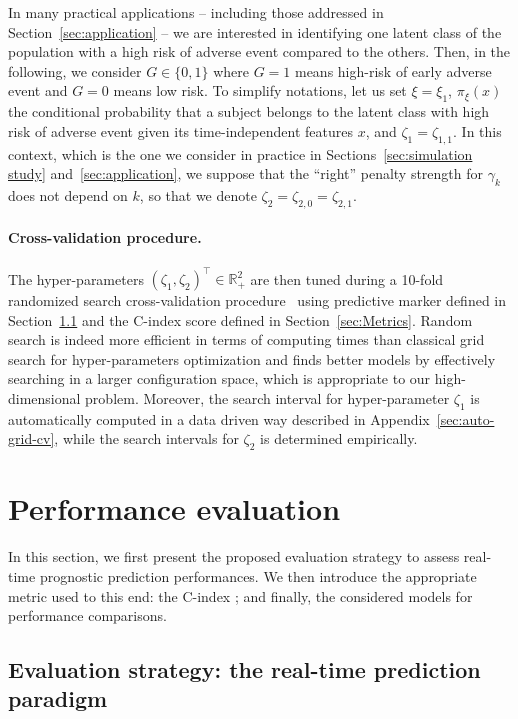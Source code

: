 \documentclass[11pt]{article}
\newcommand{\R}{\mathds R}
\begin{document}
In many practical applications -- including those addressed in Section~\ref{sec:application} -- we are interested in identifying one latent class of the population with a high risk of adverse event compared to the others. Then, in the following, we consider $G \in \{ 0, 1\}$ where $G=1$ means high-risk of early adverse event and $G=0$ means low risk.
To simplify notations, let us set $\xi = \xi_1$, $\pi_\xi(x)$ the conditional probability that a subject belongs to the latent class with high risk of adverse event given its time-independent features $x$, and $\zeta_1 = \zeta_{1,1}$.
In this context, which is the one we consider in practice in Sections~\ref{sec:simulation study} and~\ref{sec:application}, we suppose that the ``right'' penalty strength for $\gamma_k$ does not depend on $k$, so that we denote $\zeta_2 = \zeta_{2,0} = \zeta_{2,1}$. 

\paragraph{Cross-validation procedure.}

The hyper-parameters $(\zeta_1, \zeta_2)^\top \in \R_+^2$ are then tuned during a 10-fold randomized search cross-validation procedure~\citep{bergstra2012random} using predictive marker defined in Section~\ref{sec:evaluation strategy} and the C-index score defined in Section~\ref{sec:Metrics}.
Random search is indeed more efficient in terms of computing times than classical grid search for hyper-parameters optimization and finds better models by effectively searching in a larger configuration space, which is appropriate to our high-dimensional problem. Moreover, the search interval for hyper-parameter $\zeta_1$ is automatically computed in a data driven way described in Appendix~\ref{sec:auto-grid-cv}, while the search intervals for $\zeta_2$ is determined empirically.


\section{Performance evaluation}
\label{sec:Performance evaluation}

In this section, we first present the proposed evaluation strategy to assess real-time prognostic prediction performances. We then introduce the appropriate metric used to this end: the C-index ; and finally, the considered models for performance comparisons.

\subsection{Evaluation strategy: the real-time prediction paradigm}
\label{sec:evaluation strategy}
\end{document}
